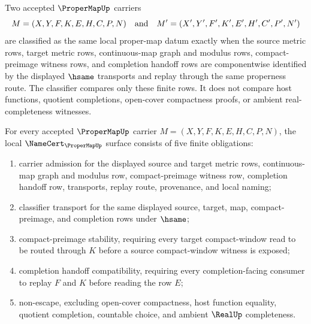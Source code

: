 \begin{definition}
\label{def:proper-map-classifier}
Two accepted $\ProperMapUp$ carriers
$$
M=(X,Y,F,K,E,H,C,P,N)
\quad\hbox{and}\quad
M'=(X',Y',F',K',E',H',C',P',N')
$$
are classified as the same local proper-map datum exactly when the source
metric rows, target metric rows, continuous-map graph and modulus rows,
compact-preimage witness rows, and completion handoff rows are componentwise
identified by the displayed $\hsame$ transports and replay through the same
properness route. The classifier compares only these finite rows. It does not
compare host functions, quotient completions, open-cover compactness proofs, or
ambient real-completeness witnesses.
\end{definition}

\begin{theorem}
\label{thm:proper-map-namecert-obligations}
For every accepted $\ProperMapUp$ carrier $M=(X,Y,F,K,E,H,C,P,N)$, the local
$\NameCert_{\ProperMapUp}$ surface consists of five finite obligations:
\begin{enumerate}
\item carrier admission for the displayed source and target metric rows,
continuous-map graph and modulus row, compact-preimage witness row,
completion handoff row, transports, replay route, provenance, and local naming;
\item classifier transport for the same displayed source, target, map,
compact-preimage, and completion rows under $\hsame$;
\item compact-preimage stability, requiring every target compact-window read to
be routed through $K$ before a source compact-window witness is exposed;
\item completion handoff compatibility, requiring every completion-facing
consumer to replay $F$ and $K$ before reading the row $E$;
\item non-escape, excluding open-cover compactness, host function equality,
quotient completion, countable choice, and ambient $\RealUp$ completeness.
\end{enumerate}
\end{theorem}
